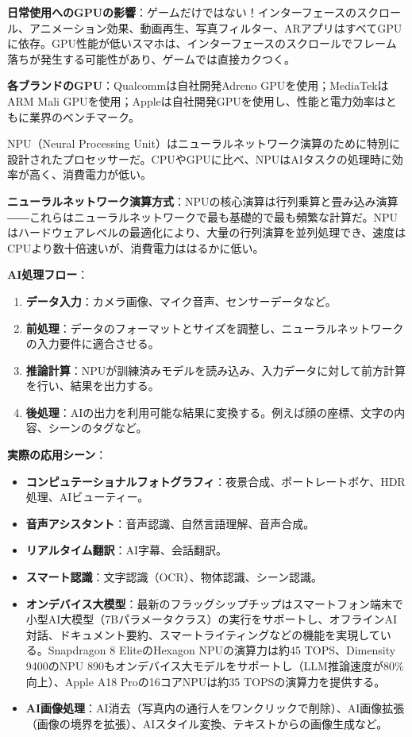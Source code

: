 \textbf{日常使用へのGPUの影響}：ゲームだけではない！インターフェースのスクロール、アニメーション効果、動画再生、写真フィルター、ARアプリはすべてGPUに依存。GPU性能が低いスマホは、インターフェースのスクロールでフレーム落ちが発生する可能性があり、ゲームでは直接カクつく。

\textbf{各ブランドのGPU}：Qualcommは自社開発Adreno GPUを使用；MediaTekはARM Mali GPUを使用；Appleは自社開発GPUを使用し、性能と電力効率はともに業界のベンチマーク。


NPU（Neural Processing Unit）はニューラルネットワーク演算のために特別に設計されたプロセッサーだ。CPUやGPUに比べ、NPUはAIタスクの処理時に効率が高く、消費電力が低い。

\textbf{ニューラルネットワーク演算方式}：NPUの核心演算は行列乗算と畳み込み演算――これらはニューラルネットワークで最も基礎的で最も頻繁な計算だ。NPUはハードウェアレベルの最適化により、大量の行列演算を並列処理でき、速度はCPUより数十倍速いが、消費電力ははるかに低い。

\textbf{AI処理フロー}：

\begin{enumerate}
  \item \textbf{データ入力}：カメラ画像、マイク音声、センサーデータなど。
  \item \textbf{前処理}：データのフォーマットとサイズを調整し、ニューラルネットワークの入力要件に適合させる。
  \item \textbf{推論計算}：NPUが訓練済みモデルを読み込み、入力データに対して前方計算を行い、結果を出力する。
  \item \textbf{後処理}：AIの出力を利用可能な結果に変換する。例えば顔の座標、文字の内容、シーンのタグなど。
\end{enumerate}

\textbf{実際の応用シーン}：

\begin{itemize}
  \item \textbf{コンピュテーショナルフォトグラフィ}：夜景合成、ポートレートボケ、HDR処理、AIビューティー。
  \item \textbf{音声アシスタント}：音声認識、自然言語理解、音声合成。
  \item \textbf{リアルタイム翻訳}：AI字幕、会話翻訳。
  \item \textbf{スマート認識}：文字認識（OCR）、物体認識、シーン認識。
  \item \textbf{オンデバイス大模型}：最新のフラッグシップチップはスマートフォン端末で小型AI大模型（7Bパラメータクラス）の実行をサポートし、オフラインAI対話、ドキュメント要約、スマートライティングなどの機能を実現している。Snapdragon 8 EliteのHexagon NPUの演算力は約45 TOPS、Dimensity 9400のNPU 890もオンデバイス大モデルをサポートし（LLM推論速度が80\%向上）、Apple A18 Proの16コアNPUは約35 TOPSの演算力を提供する。
  \item \textbf{AI画像処理}：AI消去（写真内の通行人をワンクリックで削除）、AI画像拡張（画像の境界を拡張）、AIスタイル変換、テキストからの画像生成など。
\end{itemize}

